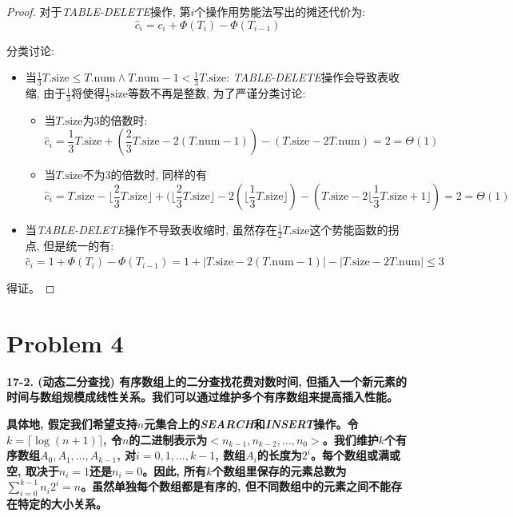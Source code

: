 \documentclass[paper=a4, fontsize=11pt]{scrartcl} %
\numberwithin{equation}{section} %
\numberwithin{figure}{section} %
\numberwithin{table}{section} %
\begin{document}
\begin{proof}
  对于\textit{TABLE-DELETE}操作, 第$i$个操作用势能法写出的摊还代价为:
  \[
  \hat{c}_i = c_i + \Phi(T_i) - \Phi(T_{i-1})
  \]

  分类讨论:
  \begin{itemize}
  \item 当$\frac{1}{3} T.\mbox{size} \leq T.\mbox{num} \land T.\mbox{num} - 1 < \frac{1}{3}T.\mbox{size}$: \textit{TABLE-DELETE}操作会导致表收缩, 由于$\frac{1}{3}$将使得$\frac{1}{3}\mbox{size}$等数不再是整数, 为了严谨分类讨论:
    \begin{itemize}
    \item 当$T.\mbox{size}$为3的倍数时:
      \[
      \hat{c}_i = \frac{1}{3}T.\mbox{size} + (\frac{2}{3}T.\mbox{size} - 2(T.\mbox{num} - 1)) - (T.\mbox{size} - 2 T.\mbox{num}) = 2 = \Theta(1)
      \]
    \item 当$T.\mbox{size}$不为3的倍数时, 同样的有
      \[
      \hat{c}_i = T.\mbox{size} - \lfloor \frac{2}{3} T.\mbox{size} \rfloor + (\lfloor \frac{2}{3}T.\mbox{size} \rfloor - 2(\lfloor \frac{1}{3}T.\mbox{size} \rfloor) - (T.\mbox{size} - 2 \lfloor \frac{1}{3}T.\mbox{size} + 1 \rfloor) = 2 = \Theta(1)
      \]
    \end{itemize}
  \item 当\textit{TABLE-DELETE}操作不导致表收缩时, 虽然存在$\frac{1}{2}T.\mbox{size}$这个势能函数的拐点, 但是统一的有: $\hat{c}_i = 1 + \Phi(T_i) - \Phi(T_{i-1}) = 1 + |T.\mbox{size} - 2 (T.\mbox{num} - 1)| - |T.\mbox{size} - 2 T.\mbox{num}| \leq 3$
  \end{itemize}
  得证。
\end{proof}

\section{Problem 4}
\textbf{17-2. (动态二分查找) 有序数组上的二分查找花费对数时间, 但插入一个新元素的时间与数组规模成线性关系。我们可以通过维护多个有序数组来提高插入性能。}

\hspace{2em}\textbf{具体地, 假定我们希望支持$n$元集合上的\textit{SEARCH}和\textit{INSERT}操作。令$k = \lceil \log(n+1) \rceil$, 令$n$的二进制表示为$<n_{k-1}, n_{k-2}, \dots, n_0>$。我们维护$k$个有序数组$A_0, A_1, \dots, A_{k-1}$, 对$i = 0, 1, \dots, k-1$, 数组$A_i$的长度为$2^i$。每个数组或满或空, 取决于$n_i = 1$还是$n_i = 0$。因此, 所有$k$个数组里保存的元素总数为$\sum_{i=0}^{k-1} {n_i2^i} = n$。虽然单独每个数组都是有序的, 但不同数组中的元素之间不能存在特定的大小关系。}
\end{document}

